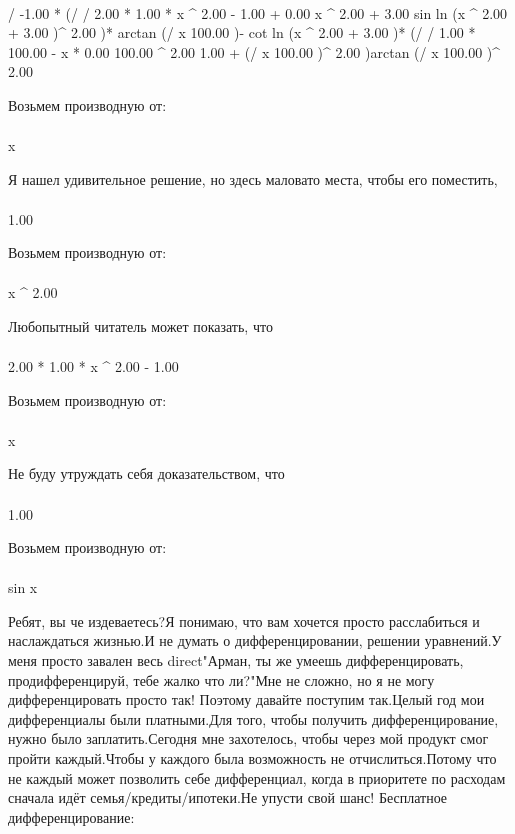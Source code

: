 \begin{gather}
\end{gather}
\begin{}
/ {-1.00 * (/ {/ {2.00 * 1.00 * x ^ {2.00 - 1.00 }+ 0.00 }{x ^ {2.00 }+ 3.00 }}{sin ln (x ^ {2.00 }+ 3.00 )^ {2.00 }})* arctan (/ {x }{100.00 })- cot ln (x ^ {2.00 }+ 3.00 )* (/ {/ {1.00 * 100.00 - x * 0.00 }{100.00 ^ {2.00 }}}{1.00 + (/ {x }{100.00 })^ {2.00 }})}{arctan (/ {x }{100.00 })^ {2.00 }}\\
\end{}
Возьмем производную от:
\begin{gather}
\end{gather}
\begin{}
x \\
\end{}
Я нашел удивительное решение, но здесь маловато места, чтобы его поместить, 
\begin{gather}
\end{gather}
\begin{}
1.00 \\
\end{}
Возьмем производную от:
\begin{gather}
\end{gather}
\begin{}
x ^ {2.00 }\\
\end{}
Любопытный читатель может показать, что
\begin{gather}
\end{gather}
\begin{}
2.00 * 1.00 * x ^ {2.00 - 1.00 }\\
\end{}
Возьмем производную от:
\begin{gather}
\end{gather}
\begin{}
x \\
\end{}
Не буду утруждать себя доказательством, что
\begin{gather}
\end{gather}
\begin{}
1.00 \\
\end{}
Возьмем производную от:
\begin{gather}
\end{gather}
\begin{}
sin x \\
\end{}
Ребят, вы че издеваетесь?Я понимаю, что вам хочется просто расслабиться и наслаждаться жизнью.И не думать о дифференцировании, решении уравнений.У меня просто завален весь direct"Арман, ты же умеешь дифференцировать, продифференцируй, тебе жалко что ли?"Мне не сложно, но я не могу дифференцировать просто так! Поэтому давайте поступим так.Целый год мои дифференциалы были платными.Для того, чтобы получить дифференцирование, нужно было заплатить.Сегодня мне захотелось, чтобы через мой продукт смог пройти каждый.Чтобы у каждого была возможность не отчислиться.Потому что не каждый может позволить себе дифференциал, когда в приоритете по расходам сначала идёт семья/кредиты/ипотеки.Не упусти свой шанс! Бесплатное дифференцирование: 

